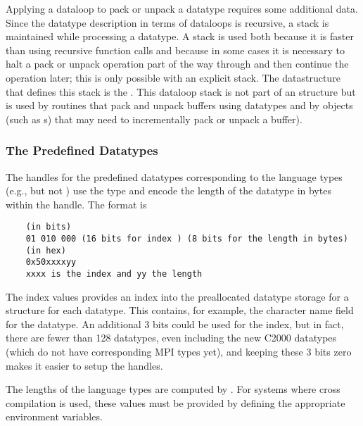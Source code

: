 \documentclass{article}
\begin{document}
Applying a dataloop to pack or unpack a datatype requires some additional
data.  Since the datatype description in terms of dataloops is recursive, a
stack is maintained while processing a datatype.  A stack is used both because
it is faster than using recursive function calls and because in some cases it
is necessary to halt a pack or unpack operation part of the way through and
then continue the operation later; this is only possible with an explicit
stack.   The datastructure that defines this stack is the
.  This dataloop stack is not part of an
 structure but is used by routines that pack and unpack
buffers using datatypes and by objects (such as s)
that may need to incrementally pack or unpack a buffer).

\subsubsection{The Predefined Datatypes}
The handles for the predefined datatypes corresponding to the language types
(e.g.,  but not ) use the
 type and encode the length of the datatype in bytes
within the handle.  The format is
\begin{verbatim}
    (in bits)
    01 010 000 (16 bits for index ) (8 bits for the length in bytes)
    (in hex)
    0x50xxxxyy
    xxxx is the index and yy the length
\end{verbatim}
The index values provides an index into the preallocated datatype storage for
a  structure for each datatype.  This contains, for
example, the character name field for the datatype.
An additional 3 bits could be used for the index, but in fact, there are fewer
than 128 datatypes, even including the new C2000 datatypes (which do not have
corresponding MPI types yet), and keeping these 3 bits zero makes it easier to
setup the handles.

The lengths of the language types are computed by .  For
systems where cross compilation is used, these values must be provided by
defining the appropriate  environment variables.
\end{document}
